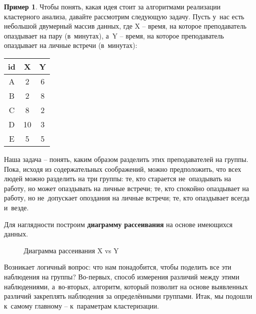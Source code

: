 \documentclass[12pt,a4paper]{article}
\theoremstyle{definition}
\newtheorem{example}{Пример}
\begin{document}
\begin{example}
 Чтобы понять, какая идея стоит за алгоритмами реализации кластерного анализа, давайте 
 рассмотрим следующую задачу. Пусть у~нас есть небольшой двумерный массив данных, 
 где $\text{X}$ – время, на которое преподаватель опаздывает на пару (в~минутах), 
 а~$\text{Y}$ – время, на которое преподаватель опаздывает на личные встречи (в~минутах):
 
 \begin{table}[ht!]
 \centering
 \begin{tabular}{c|c|c}
 \hline
  \hline
 id & X & Y \\
  \hline
  \hline
 A & 2 & 6 \\
 B & 2 &  8 \\
 C & 8 & 2 \\
 D & 10 & 3 \\
 E & 5 & 5 \\
  \hline
   \hline
 \end{tabular}
 \end{table}

Наша задача – понять, каким образом разделить этих преподавателей на группы. Пока, 
исходя из содержательных соображений, можно предположить, что всех людей можно 
разделить на три группы: те, кто старается не~опаздывать на работу, но может опаздывать на 
личные встречи; те, кто спокойно опаздывает на работу, но не~допускает опоздания 
на личные встречи; те, кто опаздывает всегда и~везде.

Для наглядности построим \textbf{диаграмму рассеивания} на основе имеющихся данных.

\begin{figure}[ht!]
\centering
{}
\caption{Диаграмма рассеивания $\text{X}$ vs $\text{Y}$}
\end{figure}

Возникает логичный вопрос: что нам понадобится, чтобы поделить все эти 
наблюдения на группы? Во-первых, способ измерения различий между этими 
наблюдениями, а~во-вторых, алгоритм, который позволит на основе выявленных 
различий закреплять наблюдения за определёнными группами. Итак, мы подошли 
к~самому главному – к~параметрам кластеризации. 
\end{example}
\end{document}

